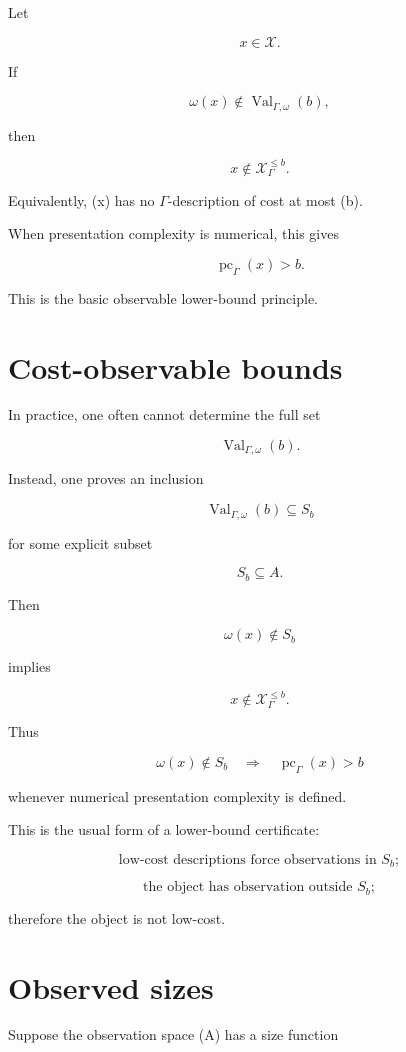 \documentclass[11pt]{article}
\begin{document}
Let

\[
x\in\mathcal X.
\]

If

\[
\omega(x)\notin \operatorname{Val}_{\Gamma,\omega}(b),
\]

then

\[
x\notin \mathcal X_\Gamma^{\leq b}.
\]

Equivalently, (x) has no \(\Gamma\)-description of cost at most (b).

When presentation complexity is numerical, this gives

\[
\operatorname{pc}_\Gamma(x)> b.
\]

This is the basic observable lower-bound principle.


\section{Cost-observable bounds}

In practice, one often cannot determine the full set

\[
\operatorname{Val}_{\Gamma,\omega}(b).
\]

Instead, one proves an inclusion

\[
\operatorname{Val}_{\Gamma,\omega}(b)\subseteq S_b
\]

for some explicit subset

\[
S_b\subseteq A.
\]

Then

\[
\omega(x)\notin S_b
\]

implies

\[
x\notin \mathcal X_\Gamma^{\leq b}.
\]

Thus

\[
\omega(x)\notin S_b
\quad\Longrightarrow\quad
\operatorname{pc}_\Gamma(x)> b
\]

whenever numerical presentation complexity is defined.

This is the usual form of a lower-bound certificate:

\[
\text{low-cost descriptions force observations in }S_b;
\]

\[
\text{the object has observation outside }S_b;
\]

therefore the object is not low-cost.


\section{Observed sizes}

Suppose the observation space (A) has a size function
\end{document}
